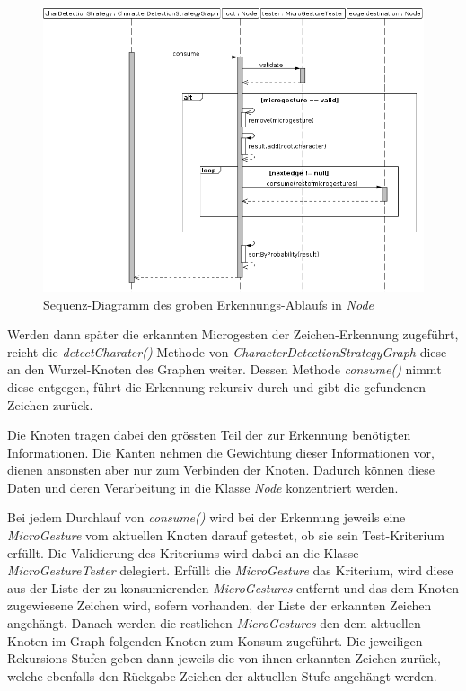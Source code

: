 \begin{figure}[h!]
   \centering
   \includegraphics[scale=0.375]{img/uml_sd_consume} 
   \caption{Sequenz-Diagramm des groben Erkennungs-Ablaufs in \emph{Node}}
   \label{fig:sd_consume}
\end{figure}

Werden dann später die erkannten Microgesten der Zeichen-Erkennung zugeführt, reicht die \emph{detectCharater()} Methode von \emph{CharacterDetectionStrategyGraph} diese an den Wurzel-Knoten des Graphen weiter. Dessen Methode \emph{consume()} nimmt diese entgegen, führt die Erkennung rekursiv durch und gibt die gefundenen Zeichen zurück.

Die Knoten tragen dabei den grössten Teil der zur Erkennung benötigten Informationen. Die Kanten nehmen die Gewichtung dieser Informationen vor, dienen ansonsten aber nur zum Verbinden der Knoten. Dadurch können diese Daten und deren Verarbeitung in die Klasse \emph{Node} konzentriert werden. 

Bei jedem Durchlauf von \emph{consume()} wird bei der Erkennung jeweils eine \emph{MicroGesture} vom aktuellen Knoten darauf getestet, ob sie sein Test-Kriterium erfüllt. Die Validierung des Kriteriums wird dabei an die Klasse \emph{MicroGestureTester} delegiert. Erfüllt die \emph{MicroGesture} das Kriterium, wird diese aus der Liste der zu konsumierenden \emph{MicroGestures} entfernt und das dem Knoten zugewiesene Zeichen wird, sofern vorhanden, der Liste der erkannten Zeichen angehängt. Danach werden die restlichen \emph{MicroGestures} den dem aktuellen Knoten im Graph folgenden Knoten zum Konsum zugeführt. Die jeweiligen Rekursions-Stufen geben dann jeweils die von ihnen erkannten Zeichen zurück, welche ebenfalls den Rückgabe-Zeichen der aktuellen Stufe angehängt werden.

